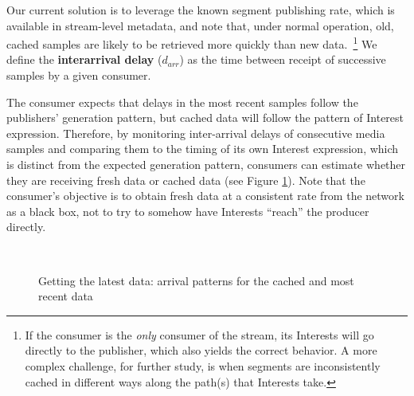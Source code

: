 \documentclass{icn/sig-alternate-2013} %
\begin{document}
Our current solution is to leverage the known segment publishing rate, which is available in stream-level metadata, and note that, under normal operation, old, cached samples are likely to be retrieved more quickly than new data.~\footnote{If the consumer is the \emph{only} consumer of the stream, its Interests will go directly to the publisher, which also yields the correct behavior. A more complex challenge, for further study, is when segments are inconsistently cached in different ways along the path(s) that Interests take.} We define the \textbf{interarrival delay} ($d_{arr}$) as the time between receipt of successive samples by a given consumer. 

The consumer expects that delays in the most recent samples follow the publishers' generation pattern, but cached data will follow the pattern of Interest expression. Therefore, by monitoring inter-arrival delays of consecutive media samples and comparing them to the timing of its own Interest expression, which is distinct from the expected generation pattern, consumers can estimate whether they are receiving fresh data or cached data (see Figure \ref{fig:inter-arrival}). Note that the consumer's objective is to obtain fresh data at a consistent rate from the network as a black box, not to try to somehow have Interests ``reach'' the producer directly.  



\begin{figure}[t!]
\centering

\\

\caption{Getting the latest data: arrival patterns for the cached and most recent data}
\label{fig:inter-arrival}
\end{figure}
\end{document}
